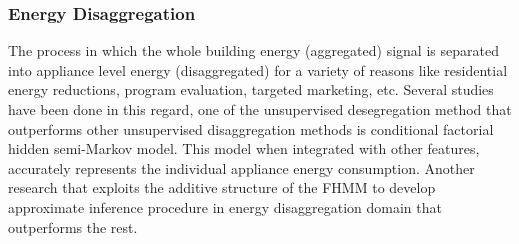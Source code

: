 \documentclass{sig-alternate}
\begin{document}

\subsubsection{Energy Disaggregation}
The process in which the whole building energy (aggregated) signal is separated into appliance level energy (disaggregated) for a variety of reasons like residential energy reductions, program evaluation, targeted marketing, etc. Several studies have been done in this regard, one of the unsupervised desegregation method \cite{DisaggregationHSMM} that outperforms other unsupervised disaggregation methods is conditional factorial hidden semi-Markov model. This model when integrated with other features, accurately represents the individual appliance energy consumption. Another research \cite{KolterJ12} that exploits the additive structure of the FHMM to develop approximate inference procedure in  energy disaggregation domain that outperforms the rest.
\end{document}
